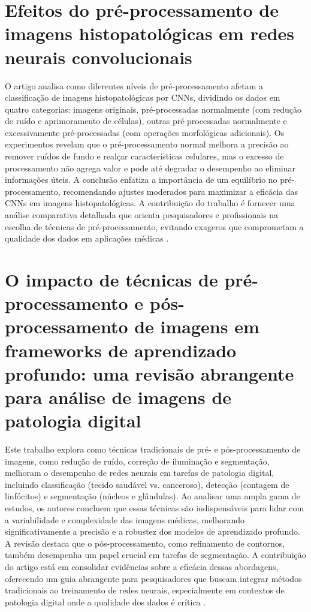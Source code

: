 \section{Efeitos do pré-processamento de imagens histopatológicas em redes neurais convolucionais}
O artigo analisa como diferentes níveis de pré-processamento afetam a classificação de imagens histopatológicas por CNNs, dividindo os dados em quatro categorias: imagens originais, pré-processadas normalmente (com redução de ruído e aprimoramento de células), outras pré-processadas normalmente e excessivamente pré-processadas (com operações morfológicas adicionais). Os experimentos revelam que o pré-processamento normal melhora a precisão ao remover ruídos de fundo e realçar características celulares, mas o excesso de processamento não agrega valor e pode até degradar o desempenho ao eliminar informações úteis. A conclusão enfatiza a importância de um equilíbrio no pré-processamento, recomendando ajustes moderados para maximizar a eficácia das CNNs em imagens histopatológicas. A contribuição do trabalho é fornecer uma análise comparativa detalhada que orienta pesquisadores e profissionais na escolha de técnicas de pré-processamento, evitando exageros que comprometam a qualidade dos dados em aplicações médicas \cite{ozturk2018histopathological}.

\section{O impacto de técnicas de pré-processamento e pós-processamento de imagens em frameworks de aprendizado profundo: uma revisão abrangente para análise de imagens de patologia digital}
Este trabalho explora como técnicas tradicionais de pré- e pós-processamento de imagens, como redução de ruído, correção de iluminação e segmentação, melhoram o desempenho de redes neurais em tarefas de patologia digital, incluindo classificação (tecido saudável vs. canceroso), detecção (contagem de linfócitos) e segmentação (núcleos e glândulas). Ao analisar uma ampla gama de estudos, os autores concluem que essas técnicas são indispensáveis para lidar com a variabilidade e complexidade das imagens médicas, melhorando significativamente a precisão e a robustez dos modelos de aprendizado profundo. A revisão destaca que o pós-processamento, como refinamento de contornos, também desempenha um papel crucial em tarefas de segmentação. A contribuição do artigo está em consolidar evidências sobre a eficácia dessas abordagens, oferecendo um guia abrangente para pesquisadores que buscam integrar métodos tradicionais ao treinamento de redes neurais, especialmente em contextos de patologia digital onde a qualidade dos dados é crítica \cite{Salvi2021}.

